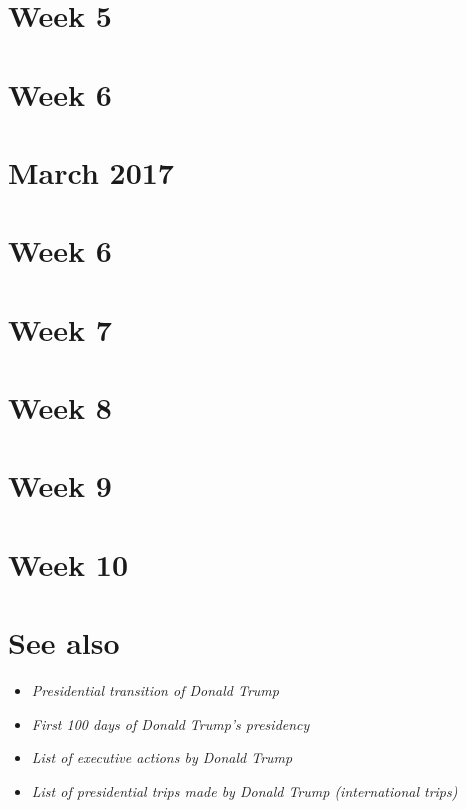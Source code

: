 \section{Week 5}\label{week-5}

\section{Week 6}\label{week-6}

\section{March 2017}\label{march-2017}

\section{Week 6}\label{week-6-1}

\section{Week 7}\label{week-7}

\section{Week 8}\label{week-8}

\section{Week 9}\label{week-9}

\section{Week 10}\label{week-10}

\section{See also}\label{see-also}

\begin{itemize}
\item
  \emph{Presidential transition of Donald Trump}
\item
  \emph{First 100 days of Donald Trump's presidency}
\item
  \emph{List of executive actions by Donald Trump}
\item
  \emph{List of presidential trips made by Donald Trump (international
  trips)}
\end{itemize}

